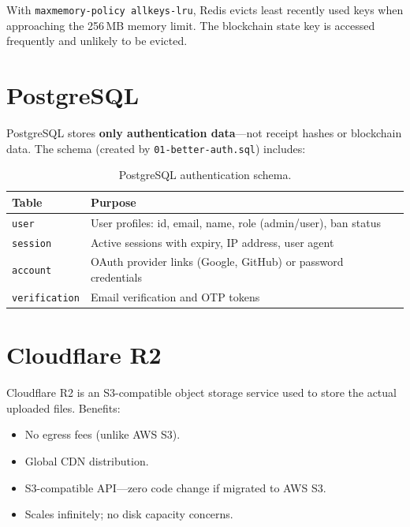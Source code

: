 \documentclass[12pt, a4paper]{report}
\begin{document}
With \texttt{maxmemory-policy allkeys-lru}, Redis evicts least recently used
keys when approaching the 256\,MB memory limit. The blockchain state key is
accessed frequently and unlikely to be evicted.

\section{PostgreSQL}

PostgreSQL stores \textbf{only authentication data}—not receipt hashes or
blockchain data. The schema (created by \texttt{01-better-auth.sql}) includes:

\begin{table}[H]
\centering
\begin{tabularx}{\textwidth}{l X}
\toprule
\textbf{Table} & \textbf{Purpose} \\
\midrule
\texttt{user} & User profiles: id, email, name, role (admin/user), ban status \\
\texttt{session} & Active sessions with expiry, IP address, user agent \\
\texttt{account} & OAuth provider links (Google, GitHub) or password credentials \\
\texttt{verification} & Email verification and OTP tokens \\
\bottomrule
\end{tabularx}
\caption{PostgreSQL authentication schema.}
\end{table}

\section{Cloudflare R2}

Cloudflare R2 is an S3-compatible object storage service used to store the
actual uploaded files. Benefits:
\begin{itemize}
    \item No egress fees (unlike AWS S3).
    \item Global CDN distribution.
    \item S3-compatible API—zero code change if migrated to AWS S3.
    \item Scales infinitely; no disk capacity concerns.
\end{itemize}


\end{document}
